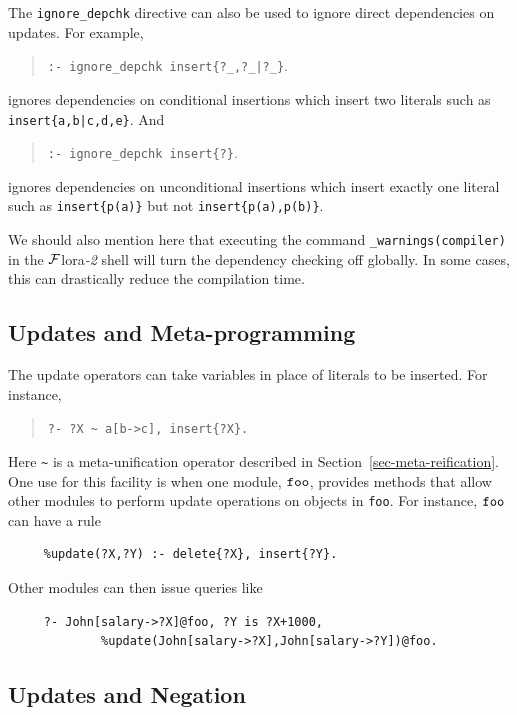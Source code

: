 \documentclass[11pt]{article}
\newcommand{\FLORA}{{\mbox{\sc ${\cal F}${lora}\rm\emph{-2}}}\xspace}
\begin{document}
The {\tt ignore\_depchk} directive can also be used to ignore direct
dependencies on updates. For example, 
\begin{quote}
{\tt :- ignore\_depchk insert\{?\_,?\_|?\_\}}.
\end{quote}
\noindent ignores dependencies on conditional insertions which insert
two literals such as {\tt insert\{a,b|c,d,e\}}. And
\begin{quote}
{\tt :- ignore\_depchk insert\{?\}}.
\end{quote}
\noindent ignores dependencies on unconditional insertions which insert
exactly one literal such as {\tt insert\{p(a)\}} but not {\tt insert\{p(a),p(b)\}}. 

We should also mention here that executing the command
\texttt{\_warnings(compiler)} in the \FLORA shell will turn the dependency
checking off globally. In some cases, this can drastically
reduce the compilation time.



\subsection{Updates and Meta-programming}

The update operators can take variables in place of literals to be
inserted.  For instance,
\begin{quote}
 {\tt ?-  ?X \verb|~| a[b->c], insert\{?X\}.}
\end{quote}
  Here \verb|~| is a meta-unification operator described in
  Section~\ref{sec-meta-reification}.
One use for this facility is when one module, $\tt foo$, provides methods that
allow other modules to perform update operations on objects in {\tt foo}.
For instance, $\tt foo$ can have a rule
\begin{verbatim}
     %update(?X,?Y) :- delete{?X}, insert{?Y}.
\end{verbatim}
Other modules can then issue queries like
\begin{verbatim}
     ?- John[salary->?X]@foo, ?Y is ?X+1000,
             %update(John[salary->?X],John[salary->?Y])@foo.  
\end{verbatim}

\subsection{Updates and Negation}
\end{document}
